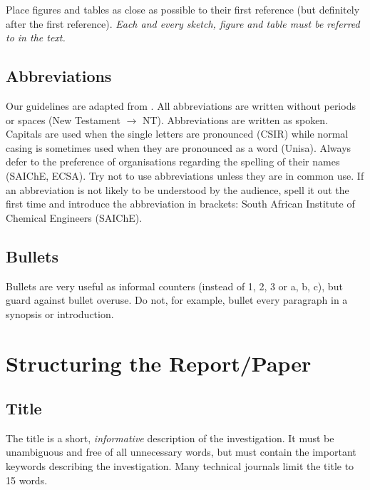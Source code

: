 \documentclass[a5paper, 10pt]{article}
\begin{document}
Place figures and tables as close as possible to their first reference (but definitely after the first reference).  
\emph{Each and every sketch, figure and  table must be referred to in the text.}

\subsection{Abbreviations}
\label{sec:abbreviations}
Our guidelines are adapted from \citet[17]{burger}.  All abbreviations
are written without periods or spaces (New Testament $\rightarrow$
NT).  Abbreviations are written as spoken. Capitals are used when the
single letters are pronounced (CSIR) while normal casing is sometimes used
when they are pronounced as a word (Unisa).  Always defer to the
preference of organisations regarding the spelling of their names
(SAIChE, ECSA).  Try not to use abbreviations unless they are in
common use.  If an abbreviation is not likely to be understood by the
audience, spell it out the first time and introduce the abbreviation
in brackets: South African Institute of Chemical Engineers (SAIChE).

\subsection{Bullets}
\label{sec:bullets}
Bullets are very useful as informal counters (instead of 1, 2, 3 or a, b, c), but guard against bullet overuse.
Do not, for example, bullet every paragraph in a synopsis or introduction.

\section{Structuring the Report/Paper}
\label{cha:structure}

\subsection{Title}
\label{sec:title}
The title is a short, \emph{informative} description of the
investigation.  It must be unambiguous and free of all unnecessary
words, but must contain the important keywords describing the
investigation. Many technical journals limit the title to 15 words.
\end{document}
